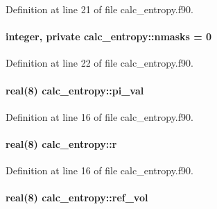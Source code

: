 Definition at line 21 of file calc\-\_\-entropy.\-f90.

\hypertarget{classcalc__entropy_a65df17917d4604d8aff01d32b1d9d2c2}{
\paragraph[{nmasks}]{\setlength{\rightskip}{0pt plus 5cm}integer, private calc\-\_\-entropy\-::nmasks = 0\hspace{0.3cm}{\ttfamily [private]}}}\label{classcalc__entropy_a65df17917d4604d8aff01d32b1d9d2c2}


Definition at line 22 of file calc\-\_\-entropy.\-f90.

\hypertarget{classcalc__entropy_ace4e0d6c83bde96c914718bedb3d95b6}{
\paragraph[{pi\-\_\-val}]{\setlength{\rightskip}{0pt plus 5cm}real(8) calc\-\_\-entropy\-::pi\-\_\-val}}\label{classcalc__entropy_ace4e0d6c83bde96c914718bedb3d95b6}


Definition at line 16 of file calc\-\_\-entropy.\-f90.

\hypertarget{classcalc__entropy_a254c581937b3c10459355e8b4ee78169}{
\paragraph[{r}]{\setlength{\rightskip}{0pt plus 5cm}real(8) calc\-\_\-entropy\-::r}}\label{classcalc__entropy_a254c581937b3c10459355e8b4ee78169}


Definition at line 16 of file calc\-\_\-entropy.\-f90.

\hypertarget{classcalc__entropy_a5d2d8c2c9a3880bcf294eeb9c9e59990}{
\paragraph[{ref\-\_\-vol}]{\setlength{\rightskip}{0pt plus 5cm}real(8) calc\-\_\-entropy\-::ref\-\_\-vol}}\label{classcalc__entropy_a5d2d8c2c9a3880bcf294eeb9c9e59990}


